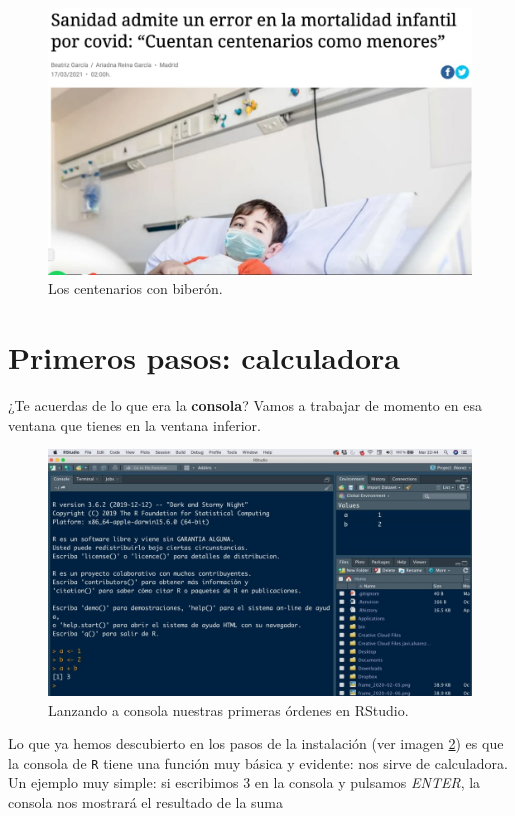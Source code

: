 \documentclass[11pt,]{book}
\begin{document}
\begin{figure}

{\centering \includegraphics[width=0.5\linewidth]{./img/excel_edades} 

}

\caption{Los centenarios con biberón.}\label{fig:excel-edades}
\end{figure}

\hypertarget{primeros-pasos-calculadora}{%
\section{Primeros pasos: calculadora}\label{primeros-pasos-calculadora}}

¿Te acuerdas de lo que era la \textbf{consola}? Vamos a trabajar de momento en esa ventana que tienes en la ventana inferior.

\begin{figure}

{\centering \includegraphics[width=0.75\linewidth]{./img/inicio_rstudio_2} 

}

\caption{Lanzando a consola nuestras primeras órdenes en RStudio.}\label{fig:inicio-rstudio-2a}
\end{figure}

Lo que ya hemos descubierto en los pasos de la instalación (ver imagen \ref{fig:inicio-rstudio-2a}) es que la consola de \texttt{R} tiene una función muy básica y evidente: nos sirve de calculadora. Un ejemplo muy simple: si escribimos 3 en la consola y pulsamos \emph{ENTER}, la consola nos mostrará el resultado de la suma
\end{document}
